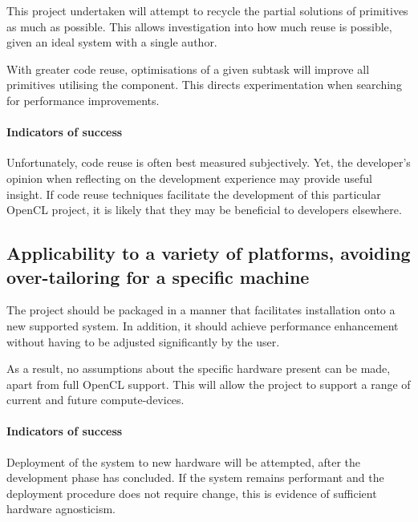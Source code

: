 This project undertaken will attempt to recycle the partial solutions of primitives as much as possible. This allows investigation into how much reuse is possible, given an ideal system with a single author.

With greater code reuse, optimisations of a given subtask will improve all primitives utilising the component. This directs experimentation when searching for performance improvements.

\paragraph*{Indicators of success}
Unfortunately, code reuse is often best measured subjectively. Yet, the developer's opinion when reflecting on the development experience may provide useful insight. If code reuse techniques facilitate the development of this particular \ac{OpenCL} project, it is likely that they may be beneficial to developers elsewhere.

\subsection{Applicability to a variety of platforms, avoiding over-tailoring for a specific machine}
The project should be packaged in a manner that facilitates installation onto a new supported system. In addition, it should achieve performance enhancement without having to be adjusted significantly by the user.

As a result, no assumptions about the specific hardware present can be made, apart from full \ac{OpenCL} support. This will allow the project to support a range of current and future compute-devices.

\paragraph*{Indicators of success}
Deployment of the system to new hardware will be attempted, after the development phase has concluded. If the system remains performant and the deployment procedure does not require change, this is evidence of sufficient hardware agnosticism.
